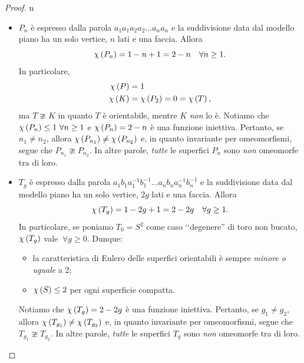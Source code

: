 \begin{proof}{n}~{}
	\begin{itemize}
		\item $P_n$ è espresso dalla parola $a_1a_1a_2a_2\ldots a_na_n$ e la suddivisione data dal modello piano ha un solo vertice, $n$ lati e una faccia. Allora
		\begin{equation*}
			\euler{P_n}{\ }=1-n+1=2-n\quad \forall n\geq 1.
		\end{equation*}
	In particolare,
	\begin{align*}
			\euler{P}{\ }&=1\\
			\euler{K}{\ }&=\euler{P_2}{\ }=0=\euler{T}{\ },
	\end{align*}
ma $T\ncong K$ in quanto $T$ è orientabile, mentre $K$ \textit{non} lo è. Notiamo che $\euler{P_n}{\ }\leq 1\ \forall n\geq 1$ e $\euler{P_n}{\ }= 2-n$ è una funzione iniettiva. Pertanto, se $n_1\neq n_2$, allora $\euler{P_{n_1}}{\ }\neq\euler{P_{n_2}}{\ }$ e, in quanto invariante per omeomorfismi, segue che $P_{n_1}\ncong P_{n_2}$. In altre parole, \textit{tutte} le superfici $P_n$ sono \textit{non} omeomorfe tra di loro.
\item $T_g$ è espresso dalla parola $a_1b_1a_1^{-1}b_1^{-1}\ldots a_nb_na_n^{-1}b_n^{-1}$ e la suddivisione data dal modello piano ha un solo vertice, $2g$ lati e una faccia. Allora
\begin{equation*}
	\euler{T_g}{\ }=1-2g+1=2-2g\quad \forall g\geq 1.
\end{equation*}
In particolare, se poniamo $T_0=S^2$ come caso ‘‘degenere'' di toro non bucato, $\euler{T_g}{\ }$ vale $\ \forall g\geq 0$. Dunque:
\begin{itemize}
	\item la caratteristica di Eulero delle superfici orientabili è sempre \textit{minore o uguale} a 2;
	\item $\euler{S}{\ }\leq 2$ per ogni superficie compatta.
\end{itemize}
Notiamo che $\euler{T_g}{\ }= 2-2g$ è una funzione iniettiva. Pertanto, se $g_1\neq g_2$, allora $\euler{T_{g_1}}{\ }\neq\euler{T_{g_2}}{\ }$ e, in quanto invariante per omeomorfismi, segue che $T_{g_1}\ncong T_{g_2}$. In altre parole, \textit{tutte} le superfici $T_g$ sono \textit{non} omeomorfe tra di loro.\qedhere
\end{itemize}
\end{proof}
